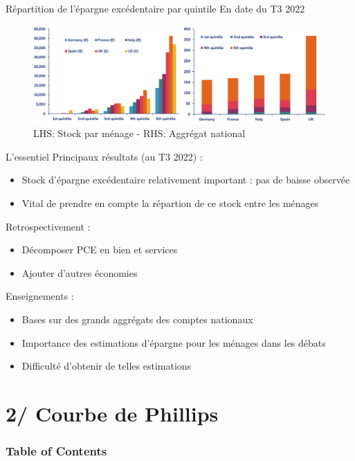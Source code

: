 \documentclass[9pt, xcolor={dvipsnames}]{beamer}
\begin{document}
\begin{frame}{Répartition de l'épargne excédentaire par quintile}
  En date du T3 2022
  \begin{figure}
    \centering
    \includegraphics[width=1\textwidth]{img/xSavings.png}
    \caption{LHS: Stock par ménage - RHS: Aggrégat national}
  \end{figure}
\end{frame}

\begin{frame}{L'essentiel}
  Principaux résultats (au T3 2022) :
  \begin{itemize}
    \item Stock d'épargne excédentaire relativement important : pas de baisse observée
    \item Vital de prendre en compte la répartion de ce stock entre les ménages
  \end{itemize}
  \vspace{.2cm}
  Retrospectivement :
  \begin{itemize}
    \item Décomposer PCE en bien et services
    \item Ajouter d'autres économies 
  \end{itemize}
  \vspace{.2cm}
  Enseignements :
  \begin{itemize}
    \item Bases sur des grands aggrégats des comptes nationaux
    \item Importance des estimations d'épargne pour les ménages dans les débats  
    \item Difficulté d'obtenir de telles estimations
  \end{itemize}
\end{frame}

\section{2/ Courbe de Phillips}
\begin{frame}
  \frametitle{Table of Contents}
  \tableofcontents[currentsection]
\end{frame}
\end{document}
